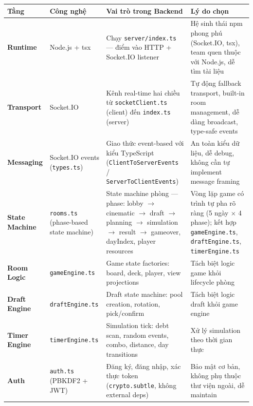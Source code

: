 \begin{longtable}{|p{2.5cm}|p{2.8cm}|p{4.5cm}|p{5.2cm}|}

\hline
\rowcolor[rgb]{0.8, 0.9, 1.0}
\textbf{Tầng} &
\textbf{Công nghệ} &
\textbf{Vai trò trong Backend} &
\textbf{Lý do chọn}
\\
\hline

\textbf{Runtime}
&
Node.js + tsx
&
Chạy \texttt{server/index.ts} --- điểm vào HTTP + Socket.IO listener
&
Hệ sinh thái npm phong phú (Socket.IO, tsx), team quen thuộc với Node.js, dễ tìm tài liệu
\\
\hline

\textbf{Transport}
&
Socket.IO
&
Kênh real-time hai chiều từ \texttt{socketClient.ts} (client) đến \texttt{index.ts} (server)
&
Tự động fallback transport, built-in room management, dễ dàng broadcast, type-safe events
\\
\hline

\textbf{Messaging}
&
Socket.IO events (\texttt{types.ts})
&
Giao thức event-based với kiểu TypeScript (\texttt{ClientToServerEvents} / \texttt{ServerToClientEvents})
&
An toàn kiểu dữ liệu, dễ debug, không cần tự implement message framing
\\
\hline

\textbf{State Machine}
&
\texttt{rooms.ts} (phase-based state machine)
&
State machine phòng --- phase: lobby $\rightarrow$ cinematic $\rightarrow$ draft $\rightarrow$ planning $\rightarrow$ simulation $\rightarrow$ result $\rightarrow$ gameover, dayIndex, player resources
&
Vòng lặp game có trình tự pha rõ ràng (5 ngày $\times$ 4 phase); kết hợp \texttt{gameEngine.ts}, \texttt{draftEngine.ts}, \texttt{timerEngine.ts}
\\
\hline

\textbf{Room Logic}
&
\texttt{gameEngine.ts}
&
Game state factories: board, deck, player, view projections
&
Tách biệt logic game khỏi lifecycle phòng
\\
\hline

\textbf{Draft Engine}
&
\texttt{draftEngine.ts}
&
Draft state machine: pool creation, rotation, pick/confirm
&
Tách biệt logic draft khỏi game engine
\\
\hline

\textbf{Timer Engine}
&
\texttt{timerEngine.ts}
&
Simulation tick: debt scan, random events, combo, distance, day transitions
&
Xử lý simulation theo thời gian thực
\\
\hline

\textbf{Auth}
&
\texttt{auth.ts} (PBKDF2 + JWT)
&
Đăng ký, đăng nhập, xác thực token (\texttt{crypto.subtle}, không external deps)
&
Bảo mật cơ bản, không phụ thuộc thư viện ngoài, dễ maintain
\\
\hline


\end{longtable}

